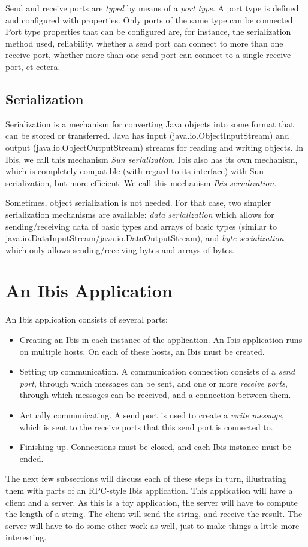 \documentclass[10pt]{article}
\newcommand{\mysection}[1]{\section{#1}\label{#1}}
\newcommand{\mysubsection}[1]{\subsection{#1}\label{#1}}
\begin{document}
Send and receive ports are \emph{typed} by means of a \emph{port type}.
A port type is defined and configured with properties.
Only ports of the same type can be connected.
Port type properties that can be configured are, for instance, the
serialization method used, reliability, whether a send port can connect
to more than one receive port, whether more than one send port can connect
to a single receive port, et cetera.

\mysubsection{Serialization}

Serialization is a mechanism for converting Java objects into some
format that can be stored or transferred.
Java has input (java.io.ObjectInputStream) and output
(java.io.ObjectOutputStream) streams for reading and writing objects.
In Ibis, we call this mechanism \emph{Sun serialization}.
Ibis also has its own mechanism, which is completely compatible
(with regard to its interface) with Sun serialization, but more efficient.
We call this mechanism \emph{Ibis serialization}.

Sometimes, object serialization is not needed. For that case, two simpler
serialization mechanisms are available: \emph{data serialization} which
allows for sending/receiving data of basic types and arrays of basic types
(similar to java.io.DataInputStream/java.io.DataOutputStream), and
\emph{byte serialization} which only allows sending/receiving bytes
and arrays of bytes.

\mysection{An Ibis Application}

An Ibis application consists of several parts:
\begin{itemize}
\item
Creating an Ibis in each instance of the application.
An Ibis application runs on multiple hosts. On each of these hosts, an Ibis
must be created.
\item
Setting up communication. A communication connection consists of a
\emph{send port}, through which messages can be sent, and one or
more \emph{receive ports},
through which messages can be received, and a connection between them.
\item
Actually communicating. A send port is used to create a 
\emph{write message}, which is sent to the receive ports that this send port
is connected to.
\item
Finishing up. Connections must be closed, and each Ibis instance must
be ended.
\end{itemize}

The next few subsections will discuss each of these steps in turn,
illustrating them with parts of an RPC-style Ibis application.
This application will have a client and a server. As this is a toy
application, the server will have to compute the length of a string.
The client will send the string, and receive the result.
The server will have to do some other work as well, just to make
things a little more interesting.
\end{document}
